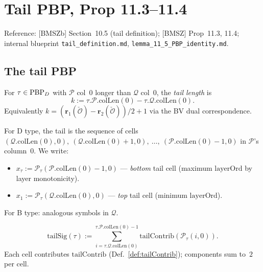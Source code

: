 \chapter{Tail PBP, Prop 11.3--11.4}
\label{chap:tail}

Reference: [BMSZb] Section~10.5 (tail definition); [BMSZ] Prop~11.3, 11.4;
internal blueprint \texttt{tail\_definition.md}, \texttt{lemma\_11\_5\_PBP\_identity.md}.

\section{The tail PBP}

\begin{definition}
  \label{def:tailLen}
  \leanok
  For $\tau \in \mathrm{PBP}_D$ with $\mathcal{P}$ col~0 longer than $\mathcal{Q}$ col~0, the
  \emph{tail length} is
  \[ k := \tau.\mathcal{P}.\mathrm{colLen}(0) - \tau.\mathcal{Q}.\mathrm{colLen}(0). \]
  Equivalently $k = (\mathbf{r}_1(\check{\mathcal{O}}) - \mathbf{r}_2(\check{\mathcal{O}}))/2 + 1$ via the BV dual correspondence.
\end{definition}

\begin{definition}
  \label{def:tailSymbol}
  \leanok
  For D type, the tail is the sequence of cells
  $(\mathcal{Q}.\mathrm{colLen}(0), 0),\ (\mathcal{Q}.\mathrm{colLen}(0) + 1, 0),\ \ldots,\ (\mathcal{P}.\mathrm{colLen}(0) - 1, 0)$
  in $\mathcal{P}$'s column~0. We write:
  \begin{itemize}
    \item $x_\tau := \mathcal{P}_\tau(\mathcal{P}.\mathrm{colLen}(0) - 1, 0)$ — \emph{bottom} tail cell (maximum $\mathrm{layerOrd}$ by layer monotonicity).
    \item $x_1 := \mathcal{P}_\tau(\mathcal{Q}.\mathrm{colLen}(0), 0)$ — \emph{top} tail cell (minimum $\mathrm{layerOrd}$).
  \end{itemize}
  For B type: analogous symbols in $\mathcal{Q}$.
\end{definition}

\begin{definition}[Tail signature $\mathrm{tailSig}(\tau) = (p_{\tau_t}, q_{\tau_t})$]
  \label{def:tailSignature}
  \leanok
  \[ \mathrm{tailSig}(\tau) := \sum_{i = \tau.\mathcal{Q}.\mathrm{colLen}(0)}^{\tau.\mathcal{P}.\mathrm{colLen}(0) - 1} \mathrm{tailContrib}(\mathcal{P}_\tau(i, 0)). \]
  Each cell contributes $\mathrm{tailContrib}$ (Def.~\ref{def:tailContrib}); components sum to~$2$ per cell.
\end{definition}


